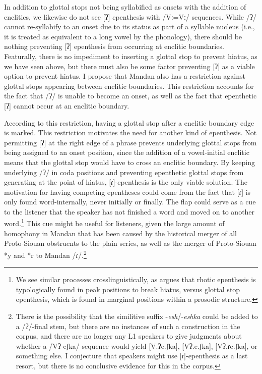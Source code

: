 In addition to glottal stops not being syllabified as onsets with the addition of enclitics, we likewise do not see [ʔ] epenthesis with /Vː=Vː/ sequences. While /ʔ/ cannot re-syllabify to an onset due to its status as part of a syllable nucleus (i.e., it is treated as equivalent to a long vowel by the phonology), there should be nothing preventing [ʔ] epenthesis from occurring at enclitic boundaries. Featurally, there is no impediment to inserting a glottal stop to prevent hiatus, as we have seen above, but there must also be some factor preventing [ʔ] as a viable option to prevent hiatus. I propose that Mandan also has a restriction against glottal stops appearing between enclitic boundaries. This restriction accounts for the fact that /ʔ/ is unable to become an onset, as well as the fact that epenthetic [ʔ] cannot occur at an enclitic boundary.

According to this restriction, having a glottal stop after a enclitic boundary edge is marked. This restriction motivates the need for another kind of epenthesis. Not permitting [ʔ] at the right edge of a phrase prevents underlying glottal stops from being assigned to an onset position, since the addition of a vowel-initial enclitic means that the glottal stop would have to cross an enclitic boundary. By keeping underlying /ʔ/ in coda positions and preventing epenthetic glottal stops from generating at the point of hiatus, [ɾ]-epenthesis is the only viable solution. The motivation for having competing epentheses could come from the fact that [ɾ] is only found word-internally, never initially or finally. The flap could serve as a cue to the listener that the speaker has not finished a word and moved on to another word.\footnote{We see similar processes crosslinguistically, as \citet{uffmann2007} argues that rhotic epenthesis is typologically found in peak positions to break hiatus, versus glottal stop epenthesis, which is found in marginal positions within a prosodic structure.} This cue might be useful for listeners, given the large amount of homophony in Mandan that has been caused by the historical merger of all Proto-Siouan obstruents to the plain series, as well as the merger of Proto-Siouan *y and *r to Mandan /ɾ/.\footnote{There is the possibility that the similitive suffix -\textit{esh}/-\textit{eshka} could be added to a /ʔ/-final stem, but there are no instances of such a construction in the corpus, and there are no longer any L1 speakers to give judgments about whether a /Vʔ-eʃka/ sequence would yield [V.ʔe.ʃka], [Vʔ.e.ʃka], [Vʔ.ɾe.ʃka], or something else. I conjecture that speakers might use [ɾ]-epenthesis as a last resort, but there is no conclusive evidence for this in the corpus.}

